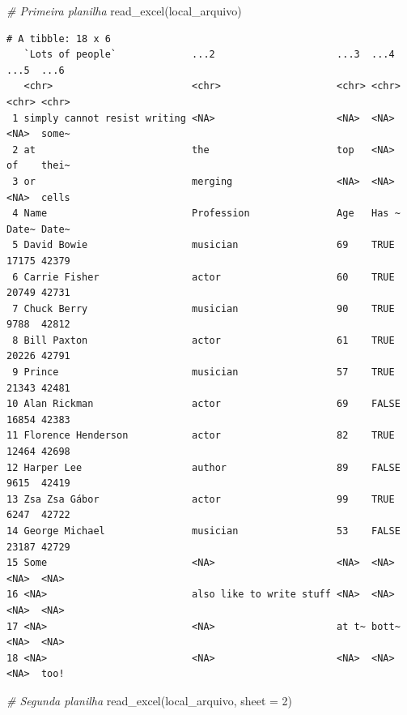 \documentclass[
  brazilian,
]{book}
\newenvironment{Shaded}{\begin{snugshade}}{\end{snugshade}}
\newcommand{\AttributeTok}[1]{\textcolor[rgb]{0.77,0.63,0.00}{#1}}
\newcommand{\CommentTok}[1]{\textcolor[rgb]{0.56,0.35,0.01}{\textit{#1}}}
\newcommand{\DecValTok}[1]{\textcolor[rgb]{0.00,0.00,0.81}{#1}}
\newcommand{\FunctionTok}[1]{\textcolor[rgb]{0.00,0.00,0.00}{#1}}
\newcommand{\NormalTok}[1]{#1}
\begin{document}
\begin{Shaded}
\begin{Highlighting}[]
\CommentTok{\# Primeira planilha}
\FunctionTok{read\_excel}\NormalTok{(local\_arquivo)}
\end{Highlighting}
\end{Shaded}

\begin{verbatim}
# A tibble: 18 x 6
   `Lots of people`             ...2                     ...3  ...4  ...5  ...6 
   <chr>                        <chr>                    <chr> <chr> <chr> <chr>
 1 simply cannot resist writing <NA>                     <NA>  <NA>  <NA>  some~
 2 at                           the                      top   <NA>  of    thei~
 3 or                           merging                  <NA>  <NA>  <NA>  cells
 4 Name                         Profession               Age   Has ~ Date~ Date~
 5 David Bowie                  musician                 69    TRUE  17175 42379
 6 Carrie Fisher                actor                    60    TRUE  20749 42731
 7 Chuck Berry                  musician                 90    TRUE  9788  42812
 8 Bill Paxton                  actor                    61    TRUE  20226 42791
 9 Prince                       musician                 57    TRUE  21343 42481
10 Alan Rickman                 actor                    69    FALSE 16854 42383
11 Florence Henderson           actor                    82    TRUE  12464 42698
12 Harper Lee                   author                   89    FALSE 9615  42419
13 Zsa Zsa Gábor                actor                    99    TRUE  6247  42722
14 George Michael               musician                 53    FALSE 23187 42729
15 Some                         <NA>                     <NA>  <NA>  <NA>  <NA> 
16 <NA>                         also like to write stuff <NA>  <NA>  <NA>  <NA> 
17 <NA>                         <NA>                     at t~ bott~ <NA>  <NA> 
18 <NA>                         <NA>                     <NA>  <NA>  <NA>  too! 
\end{verbatim}

\begin{Shaded}
\begin{Highlighting}[]
\CommentTok{\# Segunda planilha}
\FunctionTok{read\_excel}\NormalTok{(local\_arquivo, }\AttributeTok{sheet =} \DecValTok{2}\NormalTok{)}
\end{Highlighting}
\end{Shaded}
\end{document}
